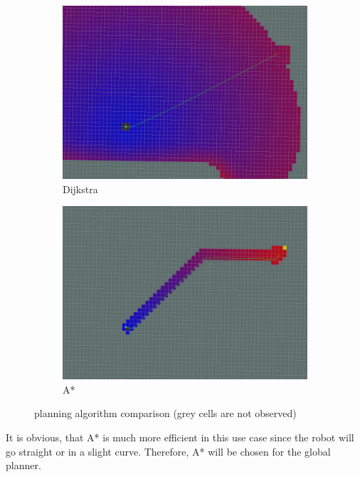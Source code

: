\begin{figure}[H]
	\begin{subfigure}{.5\linewidth}
		\includegraphics[width=\textwidth]{Pictures/Dijkstra}
		\caption{Dijkstra}
	\end{subfigure}	
	\begin{subfigure}{.5\linewidth}
		\includegraphics[width=\textwidth]{Pictures/AStar2}
		\caption{A*}
	\end{subfigure}

	\caption{planning algorithm comparison (grey cells are not observed)\cite{globalplanner}}
	\label{plannercomparison}

\end{figure}


It is obvious, that A* is much more efficient in this use case since the robot will go straight or in a slight curve. Therefore, A* will be chosen for the global planner.\\

